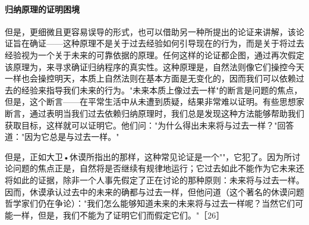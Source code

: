 \paragraph{归纳原理的证明困境}
\begin{examplebox}[title=归纳原理的证明困境]
但是，更细微且更容易误导的形式，也可以借助另一种所提出的论证来讲解，该论证旨在确证——这种原理不是关于过去经验如何引导现在的行为，而是关于将过去经验视为一个关于未来的可靠依据的原理。任何这样的论证都企图，通过再次假定该原理为，来寻求确证归纳程序的真实性。这种原理是，自然法则像它们操控今天一样也会操控明天，本质上自然法则在基本方面是无变化的，因而我们可以依赖过去的经验来指导我们未来的行为。"未来本质上像过去一样"的断言是问题的焦点，但是，这个断言——在平常生活中从未遭到质疑，结果非常难以证明。有些思想家断言，通过表明当我们过去依赖归纳原理时，我们总是发现这种方法能够帮助我们获取目标，这样就可以证明它。他们问："为什么得出未来将与过去一样？"回答道："因为它总是与过去一样。"

但是，正如大卫•休谟所指出的那样，这种常见论证是一个""，它犯了。因为所讨论问题的焦点正是，自然将是否继续有规律地运行；它过去如此不能作为它未来还将如此的证据，除非一个人事先假定了正在讨论的那种原则：未来将与过去一样。因而，休谟承认过去中的未来的确都与过去一样，但他问道（这个著名的休谟问题哲学家们仍在争论）："我们怎么能够知道未来的未来将与过去一样呢？当然它们可能一样，但是，我们不能为了证明它们而假定它们。"［26］
\end{examplebox}